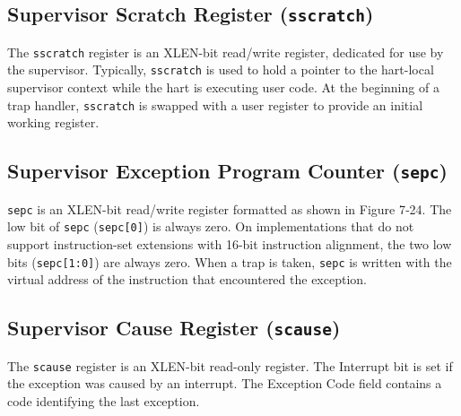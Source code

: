 \subsection{Supervisor Scratch Register (\texttt{sscratch})
}\label{supervisor-scratch-register-sscratch}

The \texttt{sscratch} register is an XLEN-bit read/write register, dedicated for
use by the supervisor. Typically, \texttt{sscratch} is used to hold a pointer to
the hart-local supervisor context while the hart is executing user code.
At the beginning of a trap handler, \texttt{sscratch} is swapped with a user
register to provide an initial working register.



\subsection{Supervisor Exception Program Counter
(\texttt{sepc})}\label{supervisor-exception-program-counter-sepc}

\texttt{sepc} is an XLEN-bit read/write register formatted as shown in Figure
7‑24. The low bit of \texttt{sepc} (\texttt{sepc{[}0{]}}) is always zero. On
implementations that do not support instruction-set extensions with
16-bit instruction alignment, the two low bits (\texttt{sepc{[}1:0{]}}) are
always zero. When a trap is taken, \texttt{sepc} is written with the virtual
address of the instruction that encountered the exception.



\subsection{Supervisor Cause Register (\texttt{scause})
}\label{supervisor-cause-register-scause}

The \texttt{scause} register is an XLEN-bit read-only register. The Interrupt bit
is set if the exception was caused by an interrupt. The Exception Code
field contains a code identifying the last exception.



